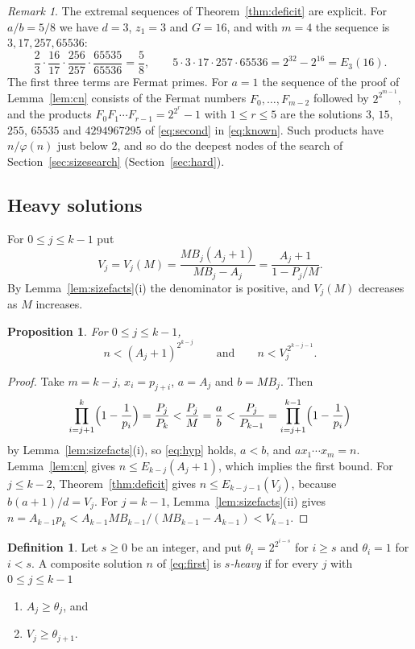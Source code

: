 \documentclass[screen,reqno]{aomart}
\numberwithin{equation}{section}
\theoremstyle{plain}
\newtheorem{proposition}[theorem]{Proposition}
\theoremstyle{definition}
\newtheorem{definition}[theorem]{Definition}
\theoremstyle{remark}
\newtheorem{remark}[theorem]{Remark}
\begin{document}
\begin{remark}\label{rem:fermat}
The extremal sequences of Theorem~\ref{thm:deficit} are explicit. For
$a/b=5/8$ we have $d=3$, $z_1=3$ and $G=16$, and with $m=4$ the
sequence is $3,17,257,65536$:
\[
  \frac23\cdot\frac{16}{17}\cdot\frac{256}{257}\cdot\frac{65535}{65536}
  =\frac58,\qquad
  5\cdot3\cdot17\cdot257\cdot65536=2^{32}-2^{16}=E_3(16).
\]
The first three terms are Fermat primes. For $a=1$ the sequence of
the proof of Lemma~\ref{lem:cn} consists of the Fermat numbers
$F_0,\dots,F_{m-2}$ followed by $2^{2^{m-1}}$, and the products
$F_0F_1\cdots F_{r-1}=2^{2^r}-1$ with $1\le r\le5$ are the solutions
$3$, $15$, $255$, $65535$ and $4294967295$ of \eqref{eq:second} in
\eqref{eq:known}. Such products have $n/\varphi(n)$ just below $2$,
and so do the deepest nodes of the search of
Section~\ref{sec:sizesearch} (Section~\ref{sec:hard}).
\end{remark}

\subsection{Heavy solutions}\label{sec:heavy}
For $0\le j\le k-1$ put
\begin{equation}\label{eq:V}
  V_j=V_j(M)=\frac{MB_j(A_j+1)}{MB_j-A_j}=\frac{A_j+1}{1-P_j/M}.
\end{equation}
By Lemma~\ref{lem:sizefacts}(i) the denominator is positive, and
$V_j(M)$ decreases as $M$ increases.

\begin{proposition}\label{prop:sizebounds}
For $0\le j\le k-1$,
\[
  n<(A_j+1)^{2^{k-j}}\qquad\text{and}\qquad n<V_j^{\,2^{k-j-1}} .
\]
\end{proposition}

\begin{proof}
Take $m=k-j$, $x_i=p_{j+i}$, $a=A_j$ and $b=MB_j$. Then
\[
  \prod_{i=j+1}^{k}\Bigl(1-\frac1{p_i}\Bigr)=\frac{P_j}{P_k}
  <\frac{P_j}{M}=\frac ab<\frac{P_j}{P_{k-1}}
  =\prod_{i=j+1}^{k-1}\Bigl(1-\frac1{p_i}\Bigr)
\]
by Lemma~\ref{lem:sizefacts}(i), so \eqref{eq:hyp} holds, $a<b$, and
$ax_1\cdots x_m=n$. Lemma~\ref{lem:cn} gives $n\le E_{k-j}(A_j+1)$,
which implies the first bound. For $j\le k-2$,
Theorem~\ref{thm:deficit} gives $n\le E_{k-j-1}(V_j)$, because
$b(a+1)/d=V_j$. For $j=k-1$, Lemma~\ref{lem:sizefacts}(ii) gives
$n=A_{k-1}p_k<A_{k-1}MB_{k-1}/(MB_{k-1}-A_{k-1})<V_{k-1}$.
\end{proof}

\begin{definition}\label{def:heavy}
Let $s\ge0$ be an integer, and put $\theta_i=2^{2^{i-s}}$ for $i\ge s$
and $\theta_i=1$ for $i<s$. A composite solution $n$ of
\eqref{eq:first} is \emph{$s$-heavy} if for every $j$ with
$0\le j\le k-1$
\begin{enumerate}[label=\textup{(H\arabic*)}]
\item $A_j\ge\theta_j$, and
\item $V_j\ge\theta_{j+1}$.
\end{enumerate}
\end{definition}
\end{document}
